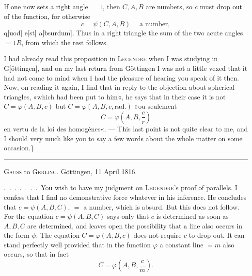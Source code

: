 \begin{center}\end{center}
\noindent If one now sets a right angle $=1$, then $C,A,B$ are numbers, so $c$ must drop out of the function, for otherwise
\[
c=\psi(C,A,B)=\text{a number},
\]
q[uod] e[st] a[bsurdum]. Thus in a right triangle the sum of the two acute angles $=1R$, from which the rest follows.

I had already read this proposition in \textsc{Legendre} when I was studying in G[öttingen], and on my last return from Göttingen I was not a little vexed that it had not come to mind when I had the pleasure of hearing you speak of it then. Now, on reading it again, I find that in reply to the objection about spherical triangles, »which had been put to him«, he says that in their case it is not $C=\varphi(A,B,c)$ but $C=\varphi(A,B,c,\mathrm{rad.})$ »ou seulement
\[
C=\varphi\!\left(A,B,\frac{c}{r}\right)
\]
en vertu de la loi des homogènes«. --- This last point is not quite clear to me, and I should very much like you to say a few words about the whole matter on some occasion.\}

\begin{center}\rule{3cm}{0.4pt}\end{center}
\begin{center}\textsc{Gauss} to \textsc{Gerling}. Göttingen, 11 April 1816.\end{center}

.\ .\ .\ .\ .\ .\ .\ You wish to have my judgment on \textsc{Legendre}'s proof of parallels. I confess that I find no demonstrative force whatever in his inference. He concludes that $c=\psi(A,B,C)$,  $=$ a number, which is absurd. But this  does not follow. For the equation $c=\psi(A,B,C)$ says only that $c$ is determined as soon as $A,B,C$ are determined, and leaves open the possibility that a  line also occurs in the form $\psi$. The equation $C=\varphi(A,B,c)$ does not require $c$ to drop out. It can stand perfectly well provided that in the function $\varphi$ a constant line $=m$ also occurs, so that in fact
\[
C=\varphi\!\left(A,B,\frac{c}{m}\right).
\]

